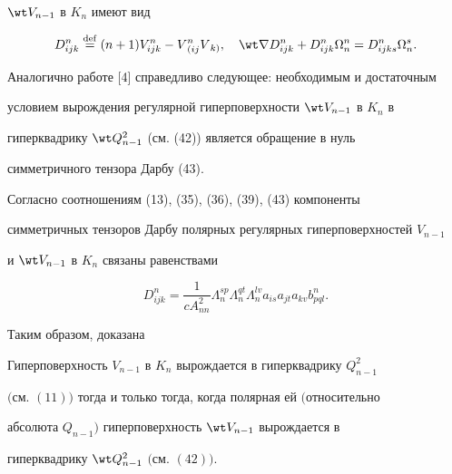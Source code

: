 $\wt V_{n-1}$ в $K_n$ имеют вид 


\begin{equation} 


D^n_{ijk}\eqdef(n+1)V^n_{ijk}-V{}^n_{(ij}V{}_{k)},\quad 


\wt\nabla D^n_{ijk}+D^n_{ijk}\Omega^n_n=D^n_{ijks}\Omega^s_n. 


\end{equation} 


 


Аналогично работе [4] справедливо следующее: необходимым и достаточным 


условием вырождения регулярной гиперповерхности $\wt V_{n-1}$ в $K_n$ в 


гиперквадрику $\wt Q^2_{n-1}$ (см. (42)) является обращение в нуль 


симметричного тензора Дарбу (43). 


 


Согласно соотношениям (13), (35), (36), (39), (43) компоненты 


симметричных тензоров Дарбу полярных регулярных гиперповерхностей $V_{n-1}$ 


и $\wt V_{n-1}$ в $K_n$ связаны равенствами 


\begin{equation} 


D^n_{ijk}=\frac{1}{c A^2_{nn}}\Lambda^{sp}_n 


\Lambda^{qt}_n\Lambda^{lv}_n a_{is}a_{jt}a_{kv}b^n_{pql}. 


\end{equation} 


 


Таким образом, доказана 


 


\begin{thm} 


Гиперповерхность $V_{n-1}$ в $K_n$ вырождается в гиперквадрику $Q^2_{n-1}$ 


$($см. $(11))$ тогда и только тогда, когда полярная ей $($относительно 


абсолюта $Q_{n-1})$ гиперповерхность $\wt V_{n-1}$ вырождается в 


гиперквадрику $\wt Q^2_{n-1}$ $($см. $(42))$. 


\end{thm} 


